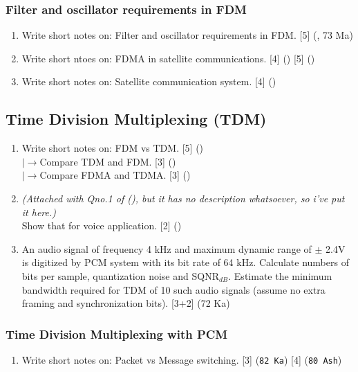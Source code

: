 \documentclass[12pt]{article}
\newcommand{\lb}{\\$\left|\rightarrow\right.$}
\begin{document}
    \subsubsection{Filter and oscillator requirements in FDM}
      \begin{enumerate}
        \item Write short notes on: Filter and oscillator requirements in FDM. \hfill [5] (, 73 Ma)

        \item Write short ntoes on: FDMA in satellite communications. \hfill [4] () [5] ()
        
        \item Write short notes on: Satellite communication system. \hfill [4] ()
      \end{enumerate}

  \subsection{Time Division Multiplexing (TDM)}
    \begin{enumerate}
      \item Write short notes on: FDM vs TDM. \hfill [5] ()
      \lb Compare TDM and FDM. \hfill [3] ()
      \lb Compare FDMA and TDMA. \hfill [3] ()

      \item \textit{(Attached with Qno.1 of (), but it has no description whatsoever, so i've put it here.)}\\
      Show that for voice application. \hfill [2] ()
      
      \item An audio signal of frequency 4 kHz and maximum dynamic range of $\pm$ 2.4V is digitized by PCM system with its bit rate of 64 kHz. Calculate numbers of bits per sample, quantization noise and SQNR$_{dB}$. Estimate the minimum bandwidth required for TDM of 10 such audio signals (assume no extra framing and synchronization bits). \hfill [3+2] (72 Ka)
    \end{enumerate}

    \subsubsection{Time Division Multiplexing with PCM}
      \begin{enumerate}
        \item Write short notes on: Packet vs Message switching. \hfill [3] (\texttt{82 Ka}) [4] (\texttt{80 Ash})
      \end{enumerate}
\end{document}
